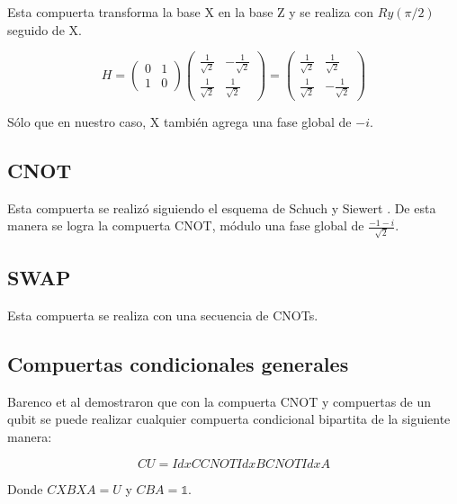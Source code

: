 Esta compuerta transforma la base X en la base Z y se realiza con $Ry(\pi/2)$ seguido de X.

\begin{equation}
    H =
    \begin{pmatrix}
        0 & 1 \\
        1 & 0
    \end{pmatrix}
    \begin{pmatrix}
        \frac{1}{\sqrt{2}} & -\frac{1}{\sqrt{2}} \\
        \frac{1}{\sqrt{2}} & \frac{1}{\sqrt{2}}
    \end{pmatrix} =
    \begin{pmatrix}
        \frac{1}{\sqrt{2}} & \frac{1}{\sqrt{2}} \\
        \frac{1}{\sqrt{2}} & -\frac{1}{\sqrt{2}}
    \end{pmatrix}
\end{equation}

Sólo que en nuestro caso, X también agrega una fase global de $-i$.

\subsection{CNOT}

Esta compuerta se realizó siguiendo el esquema de Schuch y Siewert \cite{schuch}. De esta manera se logra la compuerta CNOT, módulo una fase global de $\frac{-1-i}{\sqrt{2}}$.

\subsection{SWAP}

Esta compuerta se realiza con una secuencia de CNOTs.

\subsection{Compuertas condicionales generales}

Barenco et al \cite{barenco} demostraron que con la compuerta CNOT y compuertas de un qubit se puede realizar cualquier compuerta condicional bipartita de la siguiente manera:

\begin{equation}
    CU = IdxC CNOT IdxB CNOT IdxA
\end{equation}

Donde $C X B X A = U$ y $C B A = \mathds{1}$.

